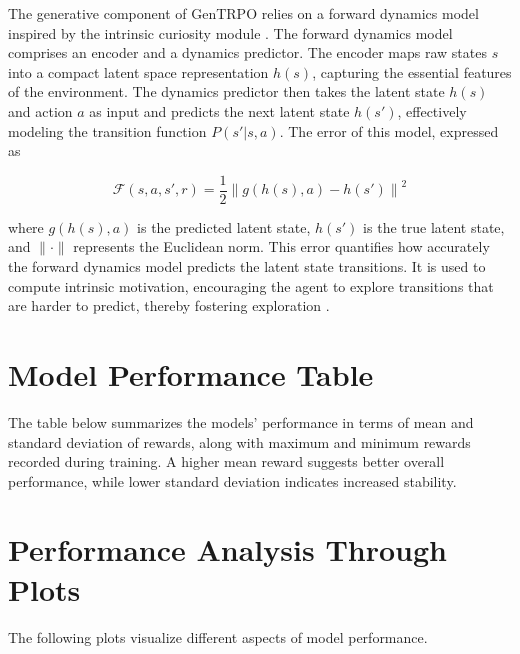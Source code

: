 \documentclass{article}
\begin{document}
The generative component of GenTRPO relies on a forward dynamics model inspired by the intrinsic curiosity module \cite{pathak2017curiositydrivenexplorationselfsupervisedprediction}. The forward dynamics model comprises an encoder and a dynamics predictor. The encoder maps raw states \( s \) into a compact latent space representation \( h(s) \), capturing the essential features of the environment. The dynamics predictor then takes the latent state \( h(s) \) and action \( a \) as input and predicts the next latent state \( h(s') \), effectively modeling the transition function \( P(s' | s, a) \). The error of this model, expressed as 

\begin{equation}
  \mathcal{F}(s, a, s', r) = \frac{1}{2} \left\| g(h(s), a) - h(s') \right\|^2
\end{equation}

where \( g(h(s), a) \) is the predicted latent state, \( h(s') \) is the true latent state, and \( \| \cdot \| \) represents the Euclidean norm. This error quantifies how accurately the forward dynamics model predicts the latent state transitions. It is used to compute intrinsic motivation, encouraging the agent to explore transitions that are harder to predict, thereby fostering exploration  \cite{wang2024prioritizedgenerativereplay}.



\section{Model Performance Table}

The table below summarizes the models' performance in terms of mean and standard deviation of rewards, along with maximum and minimum rewards recorded during training. A higher mean reward suggests better overall performance, while lower standard deviation indicates increased stability.

\bigskip
\begin{center}
  
\end{center}
\bigskip

\section{Performance Analysis Through Plots}

The following plots visualize different aspects of model performance.
\end{document}
